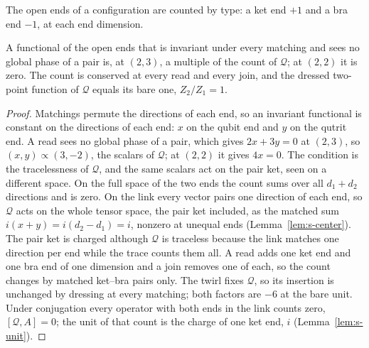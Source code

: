 The open ends of a configuration are counted by type: a ket end $+1$ and a bra end $-1$, at each end dimension.

\begin{lemma}
\label{lem:s-conserved}
A functional of the open ends that is invariant under every matching and sees no global phase of a pair is, at $(2,3)$, a multiple of the count of $\mathcal{Q}$; at $(2,2)$ it is zero. The count is conserved at every read and every join, and the dressed two-point function of $\mathcal{Q}$ equals its bare one, $Z_{2}/Z_{1}=1$.
\end{lemma}
\begin{proof}
Matchings permute the directions of each end, so an invariant functional is constant on the directions of each end: $x$ on the qubit end and $y$ on the qutrit end. A read sees no global phase of a pair, which gives $2x+3y=0$ at $(2,3)$, so $(x,y)\propto(3,-2)$, the scalars of $\mathcal{Q}$; at $(2,2)$ it gives $4x=0$. The condition is the tracelessness of $\mathcal{Q}$, and the same scalars act on the pair ket, seen on a different space. On the full space of the two ends the count sums over all $d_{1}+d_{2}$ directions and is zero. On the link every vector pairs one direction of each end, so $\mathcal{Q}$ acts on the whole tensor space, the pair ket included, as the matched sum $i(x+y)=i(d_{2}-d_{1})=i$, nonzero at unequal ends (Lemma~\ref{lem:s-center}). The pair ket is charged although $\mathcal{Q}$ is traceless because the link matches one direction per end while the trace counts them all. A read adds one ket end and one bra end of one dimension and a join removes one of each, so the count changes by matched ket--bra pairs only. The twirl fixes $\mathcal{Q}$, so its insertion is unchanged by dressing at every matching; both factors are $-6$ at the bare unit. Under conjugation every operator with both ends in the link counts zero, $[\mathcal{Q},A]=0$; the unit of that count is the charge of one ket end, $i$ (Lemma~\ref{lem:s-unit}).
\end{proof}

